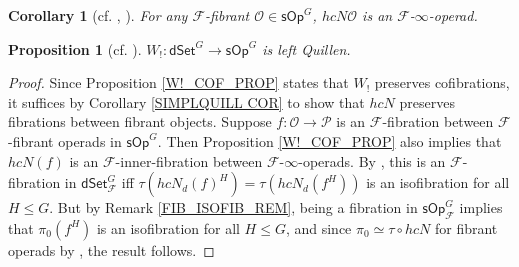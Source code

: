 \documentclass[a4paper,10pt
,draft
]{article}%
\numberwithin{equation}{section}
\numberwithin{figure}{section}
\newtheorem{proposition}[equation]{Proposition}%
\newtheorem{corollary}[equation]{Corollary}%
\theoremstyle{definition} %
\newtheorem{remark}[equation]{Remark}%
\newcommand{\Op}{\mathsf{Op}}%
\newcommand{\sOp}{\ensuremath{\mathsf{sOp}}}%
\newcommand{\dSet}{\mathsf{dSet}}
\newcommand{\F}{\ensuremath{\mathcal F}}
\renewcommand{\O}{\ensuremath{\mathcal O}}
\renewcommand{\P}{\ensuremath{\mathcal P}}
\newcommand{\1}{\ensuremath{\mathbbm 1}}%
\begin{document}
\begin{corollary}
      [{cf. \cite[Prop. 6.15]{Per18}, \cite[Cor. 4.6]{CM11}}]
      For any $\F$-fibrant $\O \in \sOp^G$, $h c N \O$ is an $\F$-$\infty$-operad.
\end{corollary}



\begin{proposition}[{cf. \cite[Prop. 4.9]{CM11}}]
      \label{W!_LEFTQ_PROP}
      $W_!: \dSet^G \to \sOp^G$ is left Quillen.
\end{proposition}
\begin{proof}
      Since Proposition \ref{W!_COF_PROP} states that $W_!$ preserves cofibrations,
      it suffices by Corollary \ref{SIMPLQUILL COR} to show that $h c N$ preserves fibrations between fibrant objects.
      Suppose $f: \O \to \P$ is an $\F$-fibration between $\F$-fibrant operads in $\sOp^G$.
      Then Proposition \ref{W!_COF_PROP} also implies that $h c N (f)$ is an $\F$-inner-fibration between $\F$-$\infty$-operads.
      By \cite[Thm. 8.22]{Per18}, this is an $\F$-fibration in $\dSet^G_\F$ iff $\tau (h c N_d(f)^H) = \tau (h c N_d(f^H))$ is an isofibration for all $H \leq G$.
      But by Remark \ref{FIB_ISOFIB_REM}, being a fibration in $\sOp^G_\F$ implies that $\pi_0(f^H)$ is an isofibration for all $H \leq G$, 
      and since $\pi_0 \simeq \tau \circ h c N$ for fibrant operads by \cite[Prop. 4.8]{CM13b}, the result follows.
\end{proof}

\end{document}
